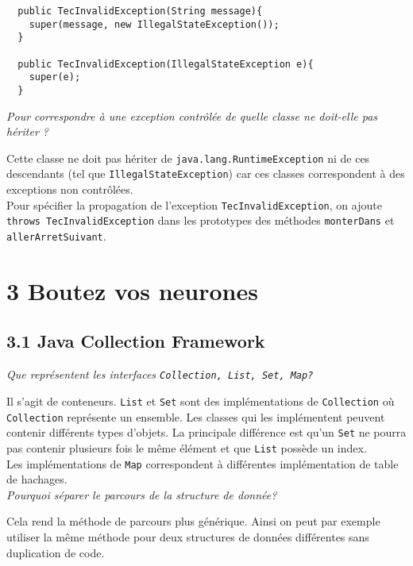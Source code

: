\documentclass{article}
\begin{document}
\begin{verbatim}
  public TecInvalidException(String message){
    super(message, new IllegalStateException());
  }
  
  public TecInvalidException(IllegalStateException e){
    super(e);
  }
\end{verbatim}

\noindent \emph{Pour correspondre à une exception contrôlée de quelle classe ne doit-elle pas hériter ?}

Cette classe ne doit pas hériter de \texttt{java.lang.RuntimeException} ni de ces descendants (tel que \texttt{IllegalStateException}) car ces classes correspondent à des exceptions non contr\^ol\'ees.\\


Pour sp\'ecifier la propagation de l'exception \texttt{TecInvalidException}, on ajoute \texttt{throws TecInvalidException} dans les prototypes des m\'ethodes \texttt{monterDans} et \texttt{allerArretSuivant}.\\


\section*{3 Boutez vos neurones}
\subsection*{3.1 Java Collection Framework}

\noindent \emph{Que représentent les interfaces \texttt{Collection, List, Set, Map?}}

Il s'agit de conteneurs. \texttt{List} et \texttt{Set} sont des implémentations de \texttt{Collection} où \texttt{Collection} représente un ensemble.
Les classes qui les implémentent peuvent contenir différents types d'objets. La principale différence est qu'un \texttt{Set} ne pourra pas contenir plusieurs fois le même élément et que \texttt{List} possède un index.\\
Les implémentations de \texttt{Map} correspondent à différentes implémentation de table de hachages.\\

\noindent \emph{Pourquoi séparer le parcours de la structure de donnée?}

Cela rend la méthode de parcours plus générique. Ainsi on peut par exemple utiliser la même méthode pour deux structures de données différentes sans duplication de code.\\
\end{document}
